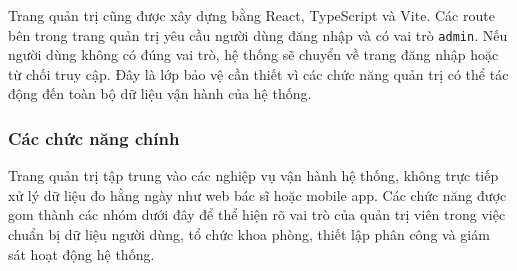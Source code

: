 \par Trang quản trị cũng được xây dựng bằng React, TypeScript và Vite. Các route bên trong trang quản trị yêu cầu người dùng đăng nhập và có vai trò \texttt{admin}. Nếu người dùng không có đúng vai trò, hệ thống sẽ chuyển về trang đăng nhập hoặc từ chối truy cập. Đây là lớp bảo vệ cần thiết vì các chức năng quản trị có thể tác động đến toàn bộ dữ liệu vận hành của hệ thống.


\subsubsection{Các chức năng chính}
\par Trang quản trị tập trung vào các nghiệp vụ vận hành hệ thống, không trực tiếp xử lý dữ liệu đo hằng ngày như web bác sĩ hoặc mobile app. Các chức năng được gom thành các nhóm dưới đây để thể hiện rõ vai trò của quản trị viên trong việc chuẩn bị dữ liệu người dùng, tổ chức khoa phòng, thiết lập phân công và giám sát hoạt động hệ thống.

